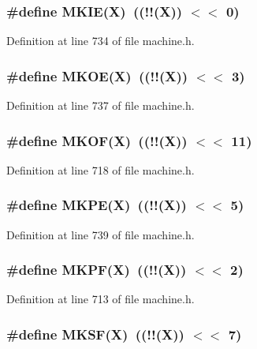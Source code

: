 \subsubsection[{MKIE}]{\setlength{\rightskip}{0pt plus 5cm}\#define MKIE(X)~((!!(X)) $<$$<$ 0)}\label{machine_8h_823df788cb6ace35cb242ce1fef55b38}




Definition at line 734 of file machine.h.
\subsubsection[{MKOE}]{\setlength{\rightskip}{0pt plus 5cm}\#define MKOE(X)~((!!(X)) $<$$<$ 3)}\label{machine_8h_eb4318ca63e69d1bab0cf3c358ea7659}




Definition at line 737 of file machine.h.
\subsubsection[{MKOF}]{\setlength{\rightskip}{0pt plus 5cm}\#define MKOF(X)~((!!(X)) $<$$<$ 11)}\label{machine_8h_e8ced467aaa1aaa2acff33490a8f449b}




Definition at line 718 of file machine.h.
\subsubsection[{MKPE}]{\setlength{\rightskip}{0pt plus 5cm}\#define MKPE(X)~((!!(X)) $<$$<$ 5)}\label{machine_8h_60824966cefb4a559fb45c5cb5f5d6e4}




Definition at line 739 of file machine.h.
\subsubsection[{MKPF}]{\setlength{\rightskip}{0pt plus 5cm}\#define MKPF(X)~((!!(X)) $<$$<$ 2)}\label{machine_8h_dc341f62e17258784a9249dfa52160cf}




Definition at line 713 of file machine.h.
\subsubsection[{MKSF}]{\setlength{\rightskip}{0pt plus 5cm}\#define MKSF(X)~((!!(X)) $<$$<$ 7)}\label{machine_8h_5e693201699cbabbdb929834982baabb}




